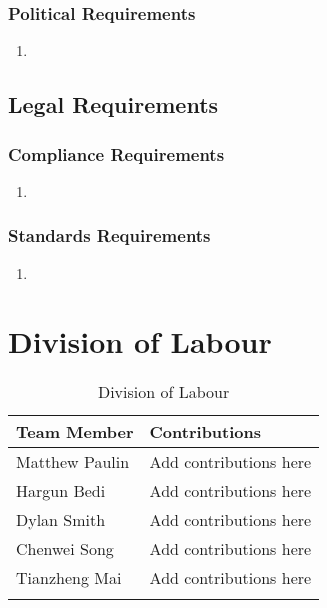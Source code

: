 \documentclass[]{article}
\begin{document}
\subsubsection{Political Requirements}
\label{ssub:political_requirements}
\begin{enumerate}[{CP}1. ]
	\item 
\end{enumerate}


\subsection{Legal Requirements}
\label{sub:legal_requirements}

\subsubsection{Compliance Requirements}
\label{ssub:compliance_requirements}
\begin{enumerate}[{LR}1. ]
	\item 
\end{enumerate}

\subsubsection{Standards Requirements}
\label{ssub:standards_requirements}
\begin{enumerate}[{LR}1. ]
	\item 
\end{enumerate}


\newpage
\appendix
\section{Division of Labour}
\label{sec:division_of_labour}


\begin{longtable}{| p{} | p{} |}
			\hline
			\textbf {Team Member} & \textbf{Contributions}\\ 
			\hline
			Matthew Paulin &  Add contributions here\\
			\hline
			Hargun Bedi & Add contributions here\\
			\hline
			Dylan Smith & Add contributions here \\ 
			\hline
			Chenwei Song & Add contributions here\\
			\hline
			Tianzheng Mai & Add contributions here\\
			\hline
			
			\caption{Division of Labour}
		\end{longtable}
\end{document}
